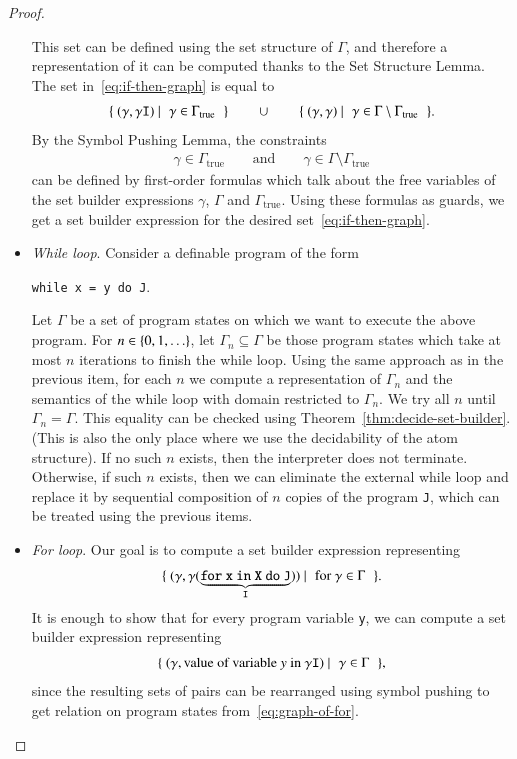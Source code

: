 \begin{proof}
\begin{itemize}
This set can be defined using the set structure of $\Gamma$, and therefore a representation of it can be computed thanks to the Set Structure Lemma. The set in~\eqref{eq:if-then-graph} is equal to
	 \begin{align*}
		\setbuild{ (\gamma, \gamma \mathtt{I})}{$\gamma \in \Gamma_{\text{true}}$} \qquad \cup \qquad \setbuild{ (\gamma, \gamma)}{ $\gamma \in \Gamma \setminus \Gamma_{\text{true}}$}.
 \end{align*} 
 By the Symbol Pushing Lemma, the constraints 
 \begin{align*}
 \gamma \in \Gamma_{\text{true}} \qquad \text{and} \qquad \gamma \in \Gamma \setminus \Gamma_{\text{true}}
 \end{align*}
 can be defined by first-order formulas which talk about the free variables of the set builder expressions $\gamma$, $\Gamma$ and $\Gamma_{\text{true}}$. Using these formulas as guards, we get a set builder expression for the desired set~\eqref{eq:if-then-graph}.
\item \emph{ While loop}. Consider a definable program of the form
\begin{center}
{\tt while x = y do J}.
\end{center}
Let $\Gamma$ be a set of program states on which we want to execute the above program. For $n \in \{0,1,\ldots\}$, 
 let $\Gamma_n \subseteq \Gamma$ be those program states which take at most $n$ iterations to finish the while loop. Using the same approach as in the previous item, for each $n$ we  compute a representation of  $\Gamma_n$ and the semantics of the while loop with domain restricted to $\Gamma_n$. We try all $n$ until $\Gamma_n = \Gamma$. This equality can be checked using Theorem~\ref{thm:decide-set-builder}. (This is also the only place where we use the decidability of the atom structure). If no such $n$ exists, then the interpreter does not terminate. Otherwise, if such $n$ exists, then we can eliminate the external while loop and replace it by sequential composition of $n$ copies of the program {\tt J}, which can be treated using the previous items.
	\item \emph{For loop}. 
 Our goal is to compute a set builder expression representing 
 \begin{align}\label{eq:graph-of-for}
 \setbuild{(\gamma, \gamma(\underbrace{{\tt for\ x\ in\ X\ do\ J}}_{\mathtt I}))}{for $\gamma \in \Gamma$}.
 \end{align}
 It is enough to show that for every program variable {\tt y}, we can compute a set builder expression representing 
 \begin{align}\label{eq:slice-of-for}
 \setbuild{(\gamma,\text{value of variable $y$ in $\gamma \mathtt I$})}{$\gamma \in \Gamma$},
 \end{align}
 since the resulting sets of pairs can be rearranged using symbol pushing to get relation on program states from~\eqref{eq:graph-of-for}.


\end{itemize}
\end{proof}
